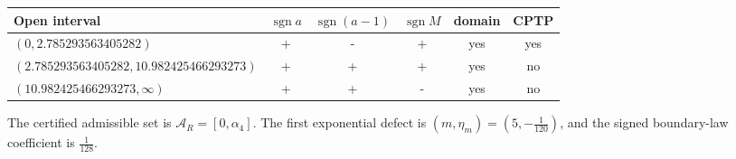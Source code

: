 \begin{center}
\begin{tabular}{@{}l c c c c c@{}}
\toprule
Open interval & $\operatorname{sgn}a$ & $\operatorname{sgn}(a-1)$ & $\operatorname{sgn}M$ & domain & CPTP \\
\midrule
$(0,2.785293563405282)$ & + & - & + & yes & yes \\
$(2.785293563405282,10.982425466293273)$ & + & + & + & yes & no \\
$(10.982425466293273,\infty)$ & + & + & - & yes & no \\
\bottomrule
\end{tabular}
\end{center}
The certified admissible set is $\mathcal A_R=[0,\alpha_4]$. The first exponential defect is $(m,\eta_m)=(5,- \frac{1}{120})$, and the signed boundary-law coefficient is $\frac{1}{128}$.
